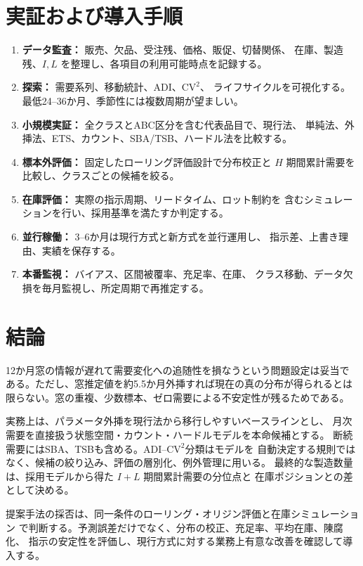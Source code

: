 \documentclass[a4paper,11pt]{jsarticle}
\begin{document}
\section{実証および導入手順}
\begin{enumerate}
\item \textbf{データ監査：} 販売、欠品、受注残、価格、販促、切替関係、
在庫、製造残、$I,L$ を整理し、各項目の利用可能時点を記録する。
\item \textbf{探索：} 需要系列、移動統計、ADI、$\mathrm{CV}^2$、
ライフサイクルを可視化する。最低24--36か月、季節性には複数周期が望ましい。
\item \textbf{小規模実証：} 全クラスとABC区分を含む代表品目で、現行法、
単純法、外挿法、ETS、カウント、SBA/TSB、ハードル法を比較する。
\item \textbf{標本外評価：} 固定したローリング評価設計で分布校正と
$H$ 期間累計需要を比較し、クラスごとの候補を絞る。
\item \textbf{在庫評価：} 実際の指示周期、リードタイム、ロット制約を
含むシミュレーションを行い、採用基準を満たすか判定する。
\item \textbf{並行稼働：} 3--6か月は現行方式と新方式を並行運用し、
指示差、上書き理由、実績を保存する。
\item \textbf{本番監視：} バイアス、区間被覆率、充足率、在庫、
クラス移動、データ欠損を毎月監視し、所定周期で再推定する。
\end{enumerate}

\section{結論}
12か月窓の情報が遅れて需要変化への追随性を損なうという問題設定は妥当で
ある。ただし、窓推定値を約5.5か月外挿すれば現在の真の分布が得られるとは
限らない。窓の重複、少数標本、ゼロ需要による不安定性が残るためである。

実務上は、パラメータ外挿を現行法から移行しやすいベースラインとし、
月次需要を直接扱う状態空間・カウント・ハードルモデルを本命候補とする。
断続需要にはSBA、TSBも含める。ADI--$\mathrm{CV}^2$分類はモデルを
自動決定する規則ではなく、候補の絞り込み、評価の層別化、例外管理に用いる。
最終的な製造数量は、採用モデルから得た $I+L$ 期間累計需要の分位点と
在庫ポジションとの差として決める。

提案手法の採否は、同一条件のローリング・オリジン評価と在庫シミュレーション
で判断する。予測誤差だけでなく、分布の校正、充足率、平均在庫、陳腐化、
指示の安定性を評価し、現行方式に対する業務上有意な改善を確認して導入する。
\end{document}
